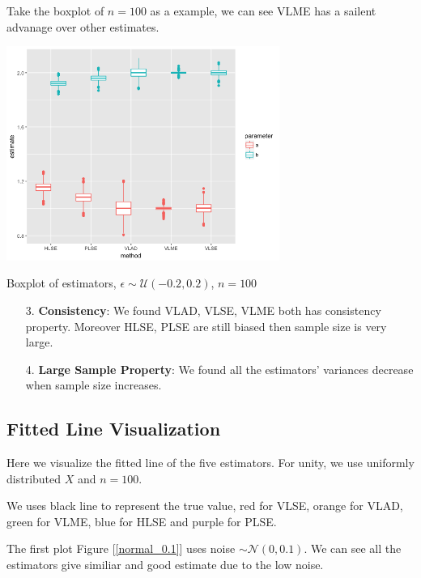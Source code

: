 \documentclass[twoside]{article}
\begin{document}
Take the boxplot of $n=100$ as a example, we can see VLME has a sailent advanage over other estimates.

\begin{center}
\makeatletter
\def\@captype{figure}
\makeatother
\includegraphics [height=7cm]{code/n=100,fixed,uniform.png}
\caption{Boxplot of estimators, $\epsilon \sim \mathcal{U}(-0.2,0.2)$, $n=100$}
\label{100-fixed-uniform}
\end{center}

\begin{itemize}
  \item [3.] \textbf{Consistency}: We found VLAD, VLSE, VLME both has consistency property. Moreover HLSE, PLSE are still biased then sample size is very large.
  \item [4.] \textbf{Large Sample Property}: We found all the estimators' variances decrease when sample size increases.
\end{itemize}

\subsection{Fitted Line Visualization}

Here we visualize the fitted line of the five estimators. For unity, we use uniformly distributed $X$ and $n=100$.

We uses black line to represent the true value, red for VLSE, orange for VLAD, green for VLME, blue for HLSE and purple for PLSE.

The first plot  Figure [\ref{normal_0.1}] uses noise $\sim \mathcal{N}(0,0.1)$. We can see all the estimators give similiar and good estimate due to the low noise.
\end{document}
